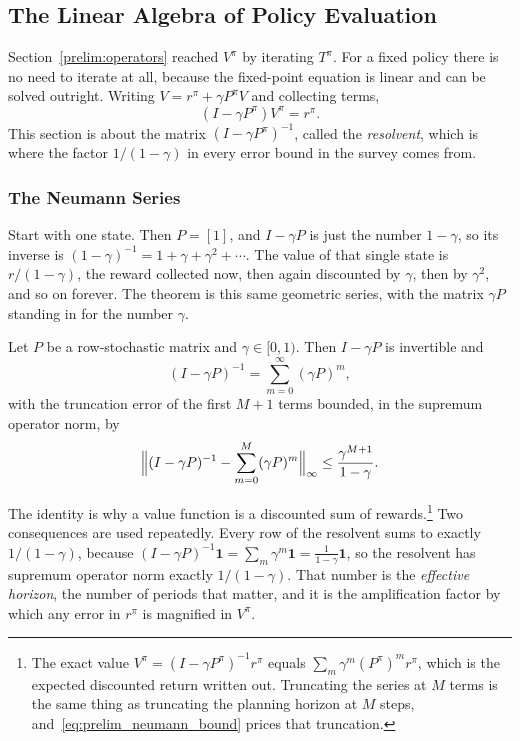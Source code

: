 \subsection{The Linear Algebra of Policy Evaluation}
\label{prelim:policy_evaluation}

Section~\ref{prelim:operators} reached $V^\pi$ by iterating $T^\pi$. For a fixed policy there is no need to iterate at all, because the fixed-point equation is linear and can be solved outright. Writing $V = r^\pi + \gamma P^\pi V$ and collecting terms,
\begin{equation}
(I - \gamma P^\pi) V^\pi = r^\pi .
\label{eq:prelim_evaluation_system}
\end{equation}
This section is about the matrix $(I - \gamma P^\pi)^{-1}$, called the \emph{resolvent}, which is where the factor $1/(1-\gamma)$ in every error bound in the survey comes from.

\subsubsection{The Neumann Series}

Start with one state. Then $P = [1]$, and $I - \gamma P$ is just the number $1 - \gamma$, so its inverse is $(1-\gamma)^{-1} = 1 + \gamma + \gamma^2 + \cdots$. The value of that single state is $r/(1-\gamma)$, the reward collected now, then again discounted by $\gamma$, then by $\gamma^2$, and so on forever. The theorem is this same geometric series, with the matrix $\gamma P$ standing in for the number $\gamma$.

\begin{theorem}
\label{thm:prelim_neumann}
Let $P$ be a row-stochastic matrix and $\gamma \in [0, 1)$. Then $I - \gamma P$ is invertible and
\begin{equation}
(I - \gamma P)^{-1} = \sum_{m=0}^{\infty} (\gamma P)^m,
\label{eq:prelim_neumann}
\end{equation}
with the truncation error of the first $M{+}1$ terms bounded, in the supremum operator norm, by
\begin{equation}
\Bigl\| (I - \gamma P)^{-1} - \sum_{m=0}^{M} (\gamma P)^m \Bigr\|_\infty \leq \frac{\gamma^{M+1}}{1 - \gamma}.
\label{eq:prelim_neumann_bound}
\end{equation}
\end{theorem}

The identity is why a value function is a discounted sum of rewards.\footnote{The exact value $V^\pi = (I - \gamma P^\pi)^{-1} r^\pi$ equals $\sum_m \gamma^m (P^\pi)^m r^\pi$, which is the expected discounted return written out. Truncating the series at $M$ terms is the same thing as truncating the planning horizon at $M$ steps, and~\eqref{eq:prelim_neumann_bound} prices that truncation.} Two consequences are used repeatedly. Every row of the resolvent sums to exactly $1/(1-\gamma)$, because $(I - \gamma P)^{-1}\mathbf{1} = \sum_m \gamma^m \mathbf{1} = \tfrac{1}{1-\gamma}\mathbf{1}$, so the resolvent has supremum operator norm exactly $1/(1-\gamma)$. That number is the \emph{effective horizon}, the number of periods that matter, and it is the amplification factor by which any error in $r^\pi$ is magnified in $V^\pi$.

